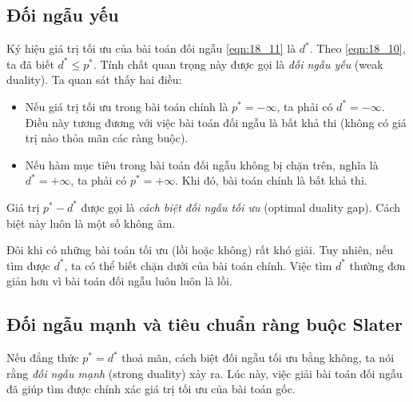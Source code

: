 \subsection{Đối ngẫu yếu}
Ký hiệu giá trị tối ưu của bài toán đối ngẫu \eqref{eqn:18_11} là $d^*$. Theo
\eqref{eqn:18_10}, ta đã biết $d^* \leq p^*$. Tính chất quan trọng này được
gọi là \textit{đối ngẫu yếu} (weak duality).
Ta quan sát thấy hai điều:
\begin{itemize}
\item Nếu giá trị tối ưu trong bài toán chính là $p^* = -\infty$, ta phải có $d^* = -\infty$. Điều này tương đương với việc bài toán đối ngẫu là bất khả thi (không có giá trị nào thỏa mãn các ràng buộc).

\item Nếu hàm mục tiêu trong bài toán đối ngẫu không bị chặn trên, nghĩa là $d^*
= +\infty$, ta phải có $p^* = +\infty$. Khi đó, bài toán chính là bất khả thi.
\end{itemize}

Giá trị $p^* - d^*$ được gọi là \textit{cách biệt đối ngẫu tối ưu} (optimal duality gap). Cách biệt này luôn là một số không âm.

Đôi khi có những bài toán tối ưu (lồi hoặc không) rất khó giải. Tuy nhiên, nếu tìm được $d^*$, ta có thể biết chặn dưới của bài toán chính. Việc tìm
$d^*$ thường đơn giản hơn vì bài toán đối ngẫu luôn luôn là lồi.


\subsection{Đối ngẫu mạnh và tiêu chuẩn ràng buộc Slater}
\label{ssec:slatter}
Nếu đẳng thức $p^* = d^*$ thoả mãn, cách biệt đối ngẫu tối ưu bằng
không, ta nói rằng \textit{đối ngẫu mạnh} (strong duality) xảy ra. Lúc này, việc giải bài
toán đối ngẫu đã giúp tìm được {chính xác} giá trị tối ưu của bài toán gốc.

